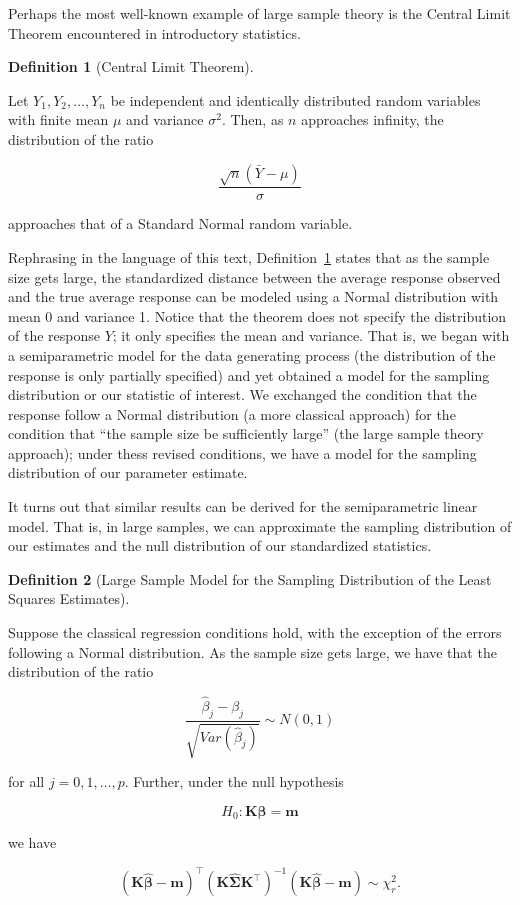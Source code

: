 \documentclass[
  letterpaper,
  DIV=11,
  numbers=noendperiod]{scrreprt}
\theoremstyle{definition}
\theoremstyle{definition}
\newtheorem{definition}{Definition}[chapter]
\theoremstyle{remark}
\begin{document}
Perhaps the most well-known example of large sample theory is the
Central Limit Theorem encountered in introductory statistics.

\begin{definition}[Central Limit
Theorem]\protect\hypertarget{def-clt}{}\label{def-clt}

Let \(Y_1, Y_2, \dotsc, Y_n\) be independent and identically distributed
random variables with finite mean \(\mu\) and variance \(\sigma^2\).
Then, as \(n\) approaches infinity, the distribution of the ratio

\[\frac{\sqrt{n}\left(\bar{Y} - \mu\right)}{\sigma}\]

approaches that of a Standard Normal random variable.

\end{definition}

Rephrasing in the language of this text, Definition~\ref{def-clt} states
that as the sample size gets large, the standardized distance between
the average response observed and the true average response can be
modeled using a Normal distribution with mean 0 and variance 1. Notice
that the theorem does not specify the distribution of the response
\(Y\); it only specifies the mean and variance. That is, we began with a
semiparametric model for the data generating process (the distribution
of the response is only partially specified) and yet obtained a model
for the sampling distribution or our statistic of interest. We exchanged
the condition that the response follow a Normal distribution (a more
classical approach) for the condition that ``the sample size be
sufficiently large'' (the large sample theory approach); under thess
revised conditions, we have a model for the sampling distribution of our
parameter estimate.

It turns out that similar results can be derived for the semiparametric
linear model. That is, in large samples, we can approximate the sampling
distribution of our estimates and the null distribution of our
standardized statistics.

\begin{definition}[Large Sample Model for the Sampling Distribution of
the Least Squares
Estimates]\protect\hypertarget{def-ls-sampling-distribution-large-samples}{}\label{def-ls-sampling-distribution-large-samples}

Suppose the classical regression conditions hold, with the exception of
the errors following a Normal distribution. As the sample size gets
large, we have that the distribution of the ratio

\[\frac{\widehat{\beta}_j - \beta_j}{\sqrt{Var\left(\widehat{\beta}_j\right)}} \sim N(0, 1)\]

for all \(j = 0, 1, \dotsc, p\). Further, under the null hypothesis

\[H_0: \mathbf{K}\boldsymbol{\beta} = \mathbf{m}\]

we have

\[\left(\mathbf{K}\widehat{\boldsymbol{\beta}} - \mathbf{m}\right)^\top \left(\mathbf{K}\widehat{\boldsymbol{\Sigma}}\mathbf{K}^\top\right)^{-1} \left(\mathbf{K}\widehat{\boldsymbol{\beta}} - \mathbf{m}\right) \sim \chi^2_r.\]

\end{definition}
\end{document}
